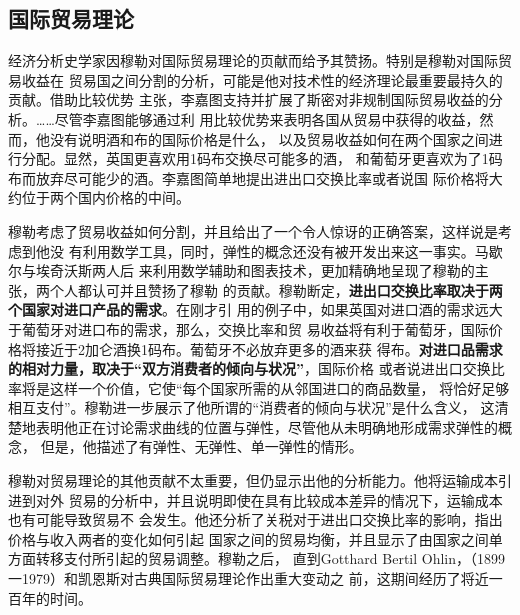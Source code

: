 \subsection{国际贸易理论}

经济分析史学家因穆勒对国际贸易理论的页献而给予其赞扬。特别是穆勒对国际贸易收益在
贸易国之间分割的分析，可能是他对技术性的经济理论最重要最持久的贡献。借助比较优势
主张，李嘉图支持并扩展了斯密对非规制国际贸易收益的分析。……尽管李嘉图能够通过利
用比较优势来表明各国从贸易中获得的收益，然而，他没有说明酒和布的国际价格是什么，
以及贸易收益如何在两个国家之间进行分配。显然，英国更喜欢用1码布交换尽可能多的酒，
和葡萄牙更喜欢为了1码布而放弃尽可能少的酒。李嘉图简单地提出进出口交换比率或者说国
际价格将大约位于两个国内价格的中间。

穆勒考虑了贸易收益如何分割，并且给出了一个令人惊讶的正确答案，这样说是考虑到他没
有利用数学工具，同时，弹性的概念还没有被开发出来这一事实。马歇尔与埃奇沃斯两人后
来利用数学辅助和图表技术，更加精确地呈现了穆勒的主张，两个人都认可并且赞扬了穆勒
的贡献。穆勒断定，\textbf{进出口交换比率取决于两个国家对进口产品的需求}。在刚才引
用的例子中，如果英国对进口酒的需求远大于葡萄牙对进口布的需求，那么，交换比率和贸
易收益将有利于葡萄牙，国际价格将接近于2加仑酒换1码布。葡萄牙不必放弃更多的酒来获
得布。\textbf{对进口品需求的相对力量，取决于“双方消费者的倾向与状况”}，国际价格
或者说进出口交换比率将是这样一个价值，它使“每个国家所需的从邻国进口的商品数量，
将恰好足够相互支付”。穆勒进一步展示了他所谓的“消费者的倾向与状况”是什么含义，
这清楚地表明他正在讨论需求曲线的位置与弹性，尽管他从未明确地形成需求弹性的概念，
但是，他描述了有弹性、无弹性、单一弹性的情形。

穆勒对贸易理论的其他贡献不太重要，但仍显示出他的分析能力。他将运输成本引进到对外
贸易的分析中，并且说明即使在具有比较成本差异的情况下，运输成本也有可能导致贸易不
会发生。他还分析了关税对于进出口交换比率的影响，指出价格与收入两者的变化如何引起
国家之间的贸易均衡，并且显示了由国家之间单方面转移支付所引起的贸易调整。穆勒之后，
直到Gotthard Bertil Ohlin，（1899一1979）和凯恩斯对古典国际贸易理论作出重大变动之
前，这期间经历了将近一百年的时间。

